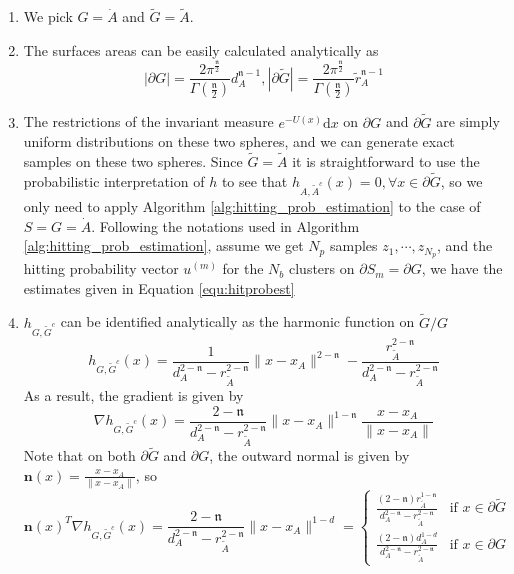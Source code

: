 \documentclass[english, aip, jcp, priprint, graphicx,floatfix]{revtex4-1}
\theoremstyle{plain}
\theoremstyle{definition}
\theoremstyle{plain}
\newcommand{\dimension}{{\mathfrak{n}}}
\begin{document}
\begin{enumerate}
	\item We pick $G = \dot{A}$ and $\tilde{G} = \tilde{A}$.
	\item The surfaces areas can be easily calculated analytically as
\[|\partial G| = \frac{2\pi^{\frac{\dimension}{2}}}{\Gamma(\frac{\dimension}{2})}d_A^{\dimension - 1}, |\partial \tilde{G}| = \frac{2\pi^{\frac{\dimension}{2}}}{\Gamma(\frac{\dimension}{2})}\tilde{r}_A^{\dimension - 1}\]
	\item The restrictions of the invariant measure $e^{- U (x)} \mathrm{d} x$ on $\partial G$ and $\partial \tilde{G}$ are simply uniform distributions on these two spheres, and we can generate exact samples on these two spheres. Since $\tilde{G} = \tilde{A}$ it is straightforward to use the probabilistic interpretation of $h$ to see that $h_{A, \tilde{A}^c} (x) = 0, \forall x \in \partial \tilde{G}$, so we only need to apply Algorithm \ref{alg:hitting_prob_estimation} to the case of $S=G=\dot{A}$. Following the notations used in Algorithm \ref{alg:hitting_prob_estimation}, assume we get $N_p$ samples $z_1,\cdots, z_{N_p}$, and the hitting probability vector $u^{(m)}$ for the $N_b$ clusters on $\partial S_m = \partial G$, we have the estimates given in Equation \ref{equ:hitprobest}
	\item $h_{G, \tilde{G}^c}$ can be identified analytically as the harmonic function on $\tilde{G} / G$\cite{Wendel1980-sj}
\[ h_{G, \tilde{G}^c} (x) = \frac{1}{d_A^{2 - \dimension} - r_{\tilde{A}}^{2 - \dimension}} \| x
- x_A \|^{2 - \dimension} - \frac{r_{\tilde{A}}^{2 - \dimension}}{d_A^{2 - \dimension} -
r_{\tilde{A}}^{2 - \dimension}} \]
As a result, the gradient is given by
\[ \nabla h_{G, \tilde{G}^c} (x) = \frac{2 - \dimension}{d_A^{2 - \dimension} - r_{\tilde{A}}^{2
   - \dimension}} \| x - x_A \|^{1 - \dimension} \frac{x - x_A}{\| x - x_A \|} \]
Note that on both $\partial \tilde{G}$ and $\partial G$, the outward normal is
given by ${\textbf{n}} (x) = \frac{x - x_A}{\| x - x_A \|}$, so
\[
	{\textbf{n}} (x)^T \nabla h_{G, \tilde{G}^c} (x) = \frac{2 - \dimension}{d_A^{2 - \dimension} - r_{\tilde{A}}^{2 - \dimension}} \| x - x_A \|^{1 - d} = 
\begin{cases}
	\frac{(2 - \dimension) r_{\tilde{A}}^{1 - \dimension}}{d_A^{2 - \dimension} - r_{\tilde{A}}^{2 - \dimension}} & \text{if }x \in \partial \tilde{G}\\
	\frac{(2 - \dimension) d_A^{1 - d}}{d_A^{2 - \dimension} - r_{\tilde{A}}^{2 - \dimension}} & \text{if }x \in \partial G
\end{cases}
\]
\end{enumerate}
\end{document}
